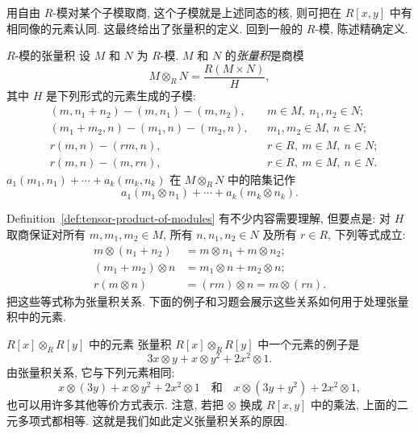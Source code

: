用自由 $R$-模对某个子模取商, 这个子模就是上述同态的核, 则可把在 $R[x,y]$ 中有相同像的元素认同. 这最终给出了张量积的定义. 回到一般的 $R$-模, 陈述精确定义.

\begin{Definition}{$R$-模的张量积}\leavevmode\label{def:tensor-product-of-modules}
设 $M$ 和 $N$ 为 $R$-模. $M$ 和 $N$ 的\emph{张量积}是商模
\[
  M\otimes_{R}N=\frac{R(M\times N)}{H},
\]
其中 $H$ 是下列形式的元素生成的子模:
\[
  \begin{aligned}
    &(m,n_{1}+n_{2})-(m,n_{1})-(m,n_{2}),
       &&m\in M,\ n_{1},n_{2}\in N;\\
    &(m_{1}+m_{2},n)-(m_{1},n)-(m_{2},n),
       &&m_{1},m_{2}\in M,\ n\in N;\\
    &r(m,n)-(rm,n), &&r\in R,\ m\in M,\ n\in N;\\
    &r(m,n)-(m,rn), &&r\in R,\ m\in M,\ n\in N.
  \end{aligned}
\]
$a_{1}(m_{1},n_{1})+\cdots+a_{k}(m_{k},n_{k})$ 在 $M\otimes_{R}N$ 中的陪集记作
\begin{equation}\label{eq:tensor-product-coset-notation}
  a_{1}(m_{1}\otimes n_{1})+\cdots+a_{k}(m_{k}\otimes n_{k}).
\end{equation}
\end{Definition}

Definition~\ref{def:tensor-product-of-modules} 有不少内容需要理解, 但要点是: 对 $H$ 取商保证对所有 $m,m_{1},m_{2}\in M$, 所有 $n,n_{1},n_{2}\in N$ 及所有 $r\in R$, 下列等式成立:
\[
  \begin{aligned}
    m\otimes(n_{1}+n_{2})&=m\otimes n_{1}+m\otimes n_{2};\\
    (m_{1}+m_{2})\otimes n&=m_{1}\otimes n+m_{2}\otimes n;\\
    r(m\otimes n)&=(rm)\otimes n=m\otimes(rn).
  \end{aligned}
\]
把这些等式称为\textquotedbl{}张量积关系\textquotedbl{}. 下面的例子和习题会展示这些关系如何用于处理张量积中的元素.

\begin{Example}{{\textmd{$R[x]\otimes_{R}R[y]$} 中的元素}}\leavevmode\label{ex:elements-of-tensor-product-of-polynomial-rings}
张量积 $R[x]\otimes_{R}R[y]$ 中一个元素的例子是
\[
  3x\otimes y+x\otimes y^{2}+2x^{2}\otimes1.
\]
由张量积关系, 它与下列元素相同:
\[
  x\otimes(3y)+x\otimes y^{2}+2x^{2}\otimes1
  \quad\text{和}\quad
  x\otimes(3y+y^{2})+2x^{2}\otimes1,
\]
也可以用许多其他等价方式表示. 注意, 若把 $\otimes$ 换成 $R[x,y]$ 中的乘法, 上面的二元多项式都相等. 这就是我们如此定义张量积关系的原因.
\end{Example}

